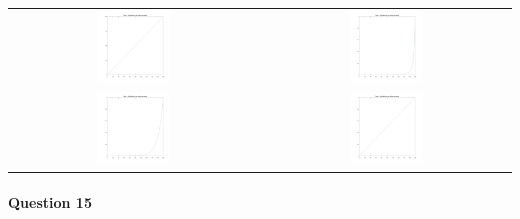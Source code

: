 \documentclass{article}
\begin{document}
\begin{table}[H]
	\centering
	\begin{tabular}{cc}
		\includegraphics[width=0.3\textwidth]{distribution_type_1.png}
		& \includegraphics[width=0.3\textwidth]{distribution_type_2.png} \\
		\includegraphics[width=0.3\textwidth]{distribution_type_3.png}
		& \includegraphics[width=0.3\textwidth]{distribution_type_4.png} \\
	\end{tabular}
\end{table}

\paragraph{Question 15}
\end{document}
